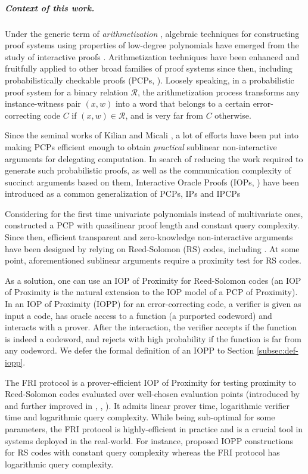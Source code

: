 \documentclass[a4paper,USenglish,autoref]{lipics-v2021}
\begin{document}
\subparagraph*{Context of this work.}
Under the generic term of \emph{arithmetization} \cite{LFKN90}, algebraic techniques for constructing proof systems using properties of low-degree polynomials have emerged from the study of interactive proofs \cite{Bab85,GMR85}. Arithmetization techniques have been enhanced and fruitfully applied to other broad families of proof systems since then, including probabilistically checkable proofs (PCPs, \cite{BFLS91, AS92, ALM+98}). Loosely speaking, in a probabilistic proof system for a binary relation $\mathcal R$, the arithmetization process transforms any instance-witness pair $(x, w)$ into a word that belongs to a certain error-correcting code $C$ if $(x, w) \in \mathcal R$, and is very far from $C$ otherwise.

Since the seminal works of Kilian \cite{Kil92} and Micali \cite{Mic95}, a lot of efforts have been put into making PCPs efficient enough to obtain \emph{practical} sublinear non-interactive arguments for delegating computation. In search of reducing the work required to generate such probabilistic proofs, as well as the communication complexity of succinct arguments based on them, Interactive Oracle Proofs (IOPs, \cite{BCS16,RRR16}) have been introduced as a common generalization of PCPs, IPs and IPCPs \cite{KR08}

Considering for the first time univariate polynomials instead of multivariate ones, \cite{BS08, Dinur07} constructed a PCP with quasilinear proof length and constant query complexity. Since then, efficient transparent and zero-knowledge non-interactive arguments have been designed by relying on Reed-Solomon (RS) codes, including \cite{AHIV17,BBHR19,BCRSVW19,BCGGRS19,KPV19,COS20,ZXZS20}. At some point, aforementioned sublinear arguments require a proximity test for RS codes. 

As a solution, one can use an IOP of Proximity for Reed-Solomon codes (an IOP of Proximity \cite{BCGRS17} is the natural extension to the IOP model of a PCP of Proximity). In an IOP of Proximity (IOPP) for an error-correcting code, a verifier is given as input a code, has oracle access to a function (a purported codeword) and interacts with a prover. After the interaction, the verifier accepts if the function is indeed a codeword, and rejects with high probability if the function is far from any codeword. We defer the formal definition of an IOPP to Section \ref{subsec:def-iopp}. 


The \textsf{FRI} protocol is a prover-efficient IOP of Proximity for testing proximity to Reed-Solomon codes evaluated over well-chosen evaluation points (introduced by \cite{BBHR18a} and further improved in \cite{BKS18}, \cite{BGKS20}, \cite{BCIKS20}). It admits linear prover time, logarithmic verifier time and logarithmic query complexity. While being sub-optimal for some parameters, the \textsf{FRI} protocol is highly-efficient in practice and is a crucial tool in systems deployed in the real-world. For instance, \cite{BCGRS17,RR20} proposed IOPP constructions for RS codes with constant query complexity whereas the \textsf{FRI} protocol has logarithmic query complexity. 
\end{document}
